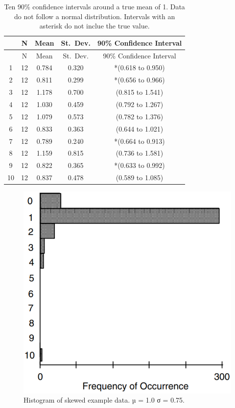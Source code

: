 \documentclass[]{book}
\begin{document}
\begin{longtable}[]{@{}ccccc@{}}
\caption{\label{tab:3-2} Ten 90\% confidence intervals around a true mean of 1. Data do not follow a normal distribution. Intervals with an asterisk do not inclue the true value.}\tabularnewline
\toprule
& N & Mean & St.~Dev. & 90\% Confidence Interval\tabularnewline
\midrule
\endfirsthead
\toprule
& N & Mean & St.~Dev. & 90\% Confidence Interval\tabularnewline
\midrule
\endhead
1 & 12 & 0.784 & 0.320 & *(0.618 to 0.950)\tabularnewline
2 & 12 & 0.811 & 0.299 & *(0.656 to 0.966)\tabularnewline
3 & 12 & 1.178 & 0.700 & (0.815 to 1.541)\tabularnewline
4 & 12 & 1.030 & 0.459 & (0.792 to 1.267)\tabularnewline
5 & 12 & 1.079 & 0.573 & (0.782 to 1.376)\tabularnewline
6 & 12 & 0.833 & 0.363 & (0.644 to 1.021)\tabularnewline
7 & 12 & 0.789 & 0.240 & *(0.664 to 0.913)\tabularnewline
8 & 12 & 1.159 & 0.815 & (0.736 to 1.581)\tabularnewline
9 & 12 & 0.822 & 0.365 & *(0.633 to 0.992)\tabularnewline
10 & 12 & 0.837 & 0.478 & (0.589 to 1.085)\tabularnewline
\bottomrule
\end{longtable}

\begin{figure}

{\centering \includegraphics[width=9.19in]{figures/3_2} 

}

\caption{Histogram of skewed example data. µ = 1.0 σ = 0.75.}\label{fig:fig-3-2}
\end{figure}
\end{document}
